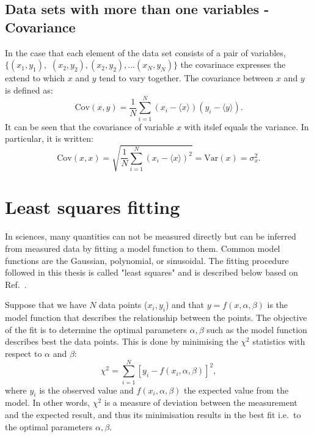 \subsection{Data sets with more than one variables - Covariance}
In the case that each element of the data set consists of a pair of variables, $\{(x_1, y_1),$ $(x_2, y_2), (x_2, y_2), ...(x_N, y_N)\}$ the covarinace expresses the extend to which $x$ and $y$ tend to vary together. The covariance between $x$ and $y$ is defined as:
\begin{equation}\label{eq:cov_def}
    \mathrm{Cov}(x, y) = \frac{1}{N} \sum_{i=1}^{N} (x_i-\langle x \rangle) (y_i-\langle y \rangle).
\end{equation}
It can be seen that the covariance of variable $x$ with itslef equals the variance. In particular, it is written:
\begin{equation}\label{eq:std_var_cov_relationship}
    \mathrm{Cov}(x, x) = \sqrt{\frac{1}{N} \sum_{i=1}^{N} (x_i-\langle x \rangle)^2} = \mathrm{Var}(x) = \sigma_x^2.
\end{equation}

\section{Least squares fitting}\label{app:non_linear_fitting}
In sciences, many quantities can not be measured directly but can be inferred from measured data by fitting a model function to them. Common model functions are the Gaussian, polynomial, or sinusoidal. The fitting procedure followed in this thesis is called "least squares" and is described below based on Ref.~\cite{least_square_minimisation}.

Suppose that we have $N$ data points ($x_{i}, y_{i}$) and that $y=f(x,\alpha, \beta)$ is the model function that describes the relationship between the points. The objective of the fit is to determine the optimal parameters $\alpha, \beta$ such as the model function describes best the data points. This is done by minimising the $\chi^2$ statistics with respect to $\alpha$ and $\beta$:
\begin{equation}\label{eq:chi_square}
    \chi^2 = \sum_{i=1}^{N}[y_{i}-f(x_{i},\alpha, \beta)]^2,
\end{equation}
where $y_{i}$ is the observed value and $f(x_{i},\alpha, \beta)$ the expected value from the model. In other words, $\chi^2$ is a measure of deviation between the measurement and the expected result, and thus its minimisation results in the best fit i.e.\ to the optimal parameters $\alpha, \beta$.


